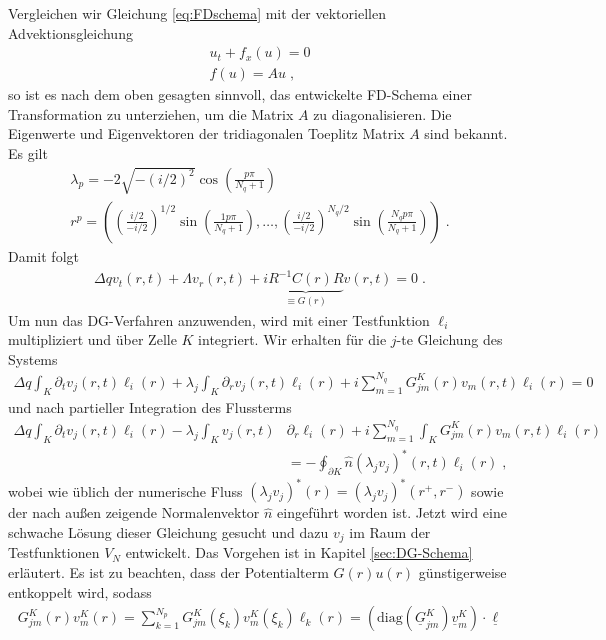 Vergleichen wir Gleichung \eqref{eq:FDschema} mit der vektoriellen Advektionsgleichung
\begin{align}
  u_t + f_x(u) = 0 \\
  f(u) = Au \; ,
\end{align}
so ist es nach dem oben gesagten sinnvoll, das entwickelte FD-Schema einer Transformation zu unterziehen, um die Matrix $A$ zu diagonalisieren. Die Eigenwerte und Eigenvektoren der tridiagonalen Toeplitz Matrix $A$ sind bekannt. Es gilt
\begin{align}
  \lambda_p = -2\sqrt{-(i/2)^2}\cos\left(\frac{p\pi}{N_q+1}\right) \\
  r^p = \left( \left( \frac{i/2}{-i/2} \right)^{1/2} \sin \left( \frac{1 p\pi }{N_q+1} \right), \ldots , \left( \frac{i/2}{-i/2} \right)^{N_q/2} \sin \left( \frac{N_q p \pi}{N_q+1} \right) \right) \; .
\end{align}
Damit folgt
\begin{align}
  \Delta q v_t(r,t) + \Lambda v_r(r,t) + i \underbrace{R^{-1}C(r)R}_{\equiv G(r)} v(r,t) = 0 \; .
  \label{eq:lvn_diagonalisiert}
\end{align}
Um nun das DG-Verfahren anzuwenden, wird mit einer Testfunktion $\ell_i$ multipliziert und über Zelle $K$ integriert. Wir erhalten für die $j$-te Gleichung des Systems
\begin{align*}
  \Delta q \int_K \partial_t v_j(r,t)\ell_i(r) + \lambda_j \int_K \partial_r v_j(r,t) \ell_i(r) + i \sum_{m=1}^{N_q} G^K_{jm}(r) v_m(r,t) \ell_i(r) = 0
\end{align*}
und nach partieller Integration des Flussterms
\begin{align*}
  \Delta q \int_K \partial_t v_j(r,t)\ell_i(r) - \lambda_j \int_K v_j(r,t) &\partial_r\ell_i(r) + i \sum_{m=1}^{N_q} \int_K G^K_{jm}(r) v_m(r,t) \ell_i(r)\\
      &= - \oint_{\partial K}  \hat{n} (\lambda_j v_j)^*(r,t)\ell_i(r) \; ,
\end{align*}
wobei wie üblich der numerische Fluss $(\lambda_j v_j)^*(r) = (\lambda_j v_j)^*(r^+, r^-)$ sowie der nach außen zeigende Normalenvektor $\hat{n}$ eingeführt worden ist. Jetzt wird eine schwache Lösung dieser Gleichung gesucht und dazu $v_j$ im Raum der Testfunktionen $V_N$ entwickelt. Das Vorgehen ist in Kapitel \ref{sec:DG-Schema} erläutert. Es ist zu beachten, dass der Potentialterm $G(r)u(r)$ günstigerweise entkoppelt wird, sodass
\begin{align}
  G_{jm}^K(r)v_m^K(r) = \sum_{k=1}^{N_p} G_{jm}^K(\xi_k)v_m^K(\xi_k) \ell_k(r) = \left(\text{diag}(\underline{G}_{jm}^K) \underline{v}_m^K\right) \cdot \underline{ \ell }
\end{align}
